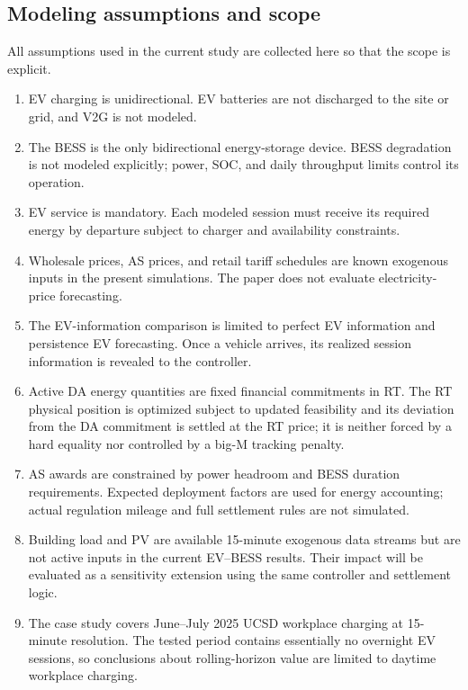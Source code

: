 \documentclass[final,5p,times]{elsarticle}
\begin{document}
\subsection{Modeling assumptions and scope}
\label{sec:assumptions}
All assumptions used in the current study are collected here so that the scope is explicit.
\begin{enumerate}[leftmargin=*]
    \item EV charging is unidirectional. EV batteries are not discharged to the site or grid, and V2G is not modeled.
    \item The BESS is the only bidirectional energy-storage device. BESS degradation is not modeled explicitly; power, SOC, and daily throughput limits control its operation.
    \item EV service is mandatory. Each modeled session must receive its required energy by departure subject to charger and availability constraints.
    \item Wholesale prices, AS prices, and retail tariff schedules are known exogenous inputs in the present simulations. The paper does not evaluate electricity-price forecasting.
    \item The EV-information comparison is limited to perfect EV information and persistence EV forecasting. Once a vehicle arrives, its realized session information is revealed to the controller.
    \item Active DA energy quantities are fixed financial commitments in RT. The RT physical position is optimized subject to updated feasibility and its deviation from the DA commitment is settled at the RT price; it is neither forced by a hard equality nor controlled by a big-M tracking penalty.
    \item AS awards are constrained by power headroom and BESS duration requirements. Expected deployment factors are used for energy accounting; actual regulation mileage and full settlement rules are not simulated.
    \item Building load and PV are available 15-minute exogenous data streams but are not active inputs in the current EV--BESS results. Their impact will be evaluated as a sensitivity extension using the same controller and settlement logic.
    \item The case study covers June--July 2025 UCSD workplace charging at 15-minute resolution. The tested period contains essentially no overnight EV sessions, so conclusions about rolling-horizon value are limited to daytime workplace charging.
\end{enumerate}
\end{document}
